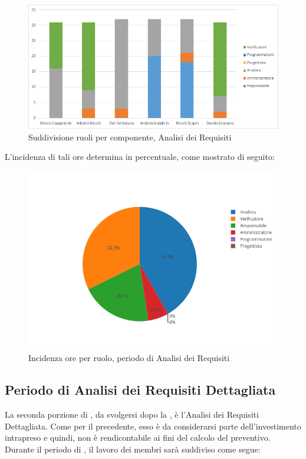 \begin{figure}[H]
	\centering
	\includegraphics[scale=0.6]{img/6-1.png}
	\caption{Suddivisione ruoli per componente, Analisi dei Requisiti}
\end{figure}

L'incidenza di tali ore determina in percentuale, come mostrato di seguito:
\begin{figure}[H]
	\centering
	\includegraphics[scale=0.6]{img/AnalisiRequisiti.png}
	\caption{Incidenza ore per ruolo, periodo di Analisi dei Requisiti}
\end{figure}

\newpage
\subsection{Periodo di Analisi dei Requisiti Dettagliata}
La seconda porzione di \AdR, da svolgersi dopo la \RR, è l'Analisi dei Requisiti Dettagliata. Come per il precedente, esso è da considerarsi parte dell'investimento intrapreso e quindi, non è rendicontabile ai fini del calcolo del preventivo. 
Durante il periodo di \ARD, il lavoro dei membri sarà suddiviso come segue:

